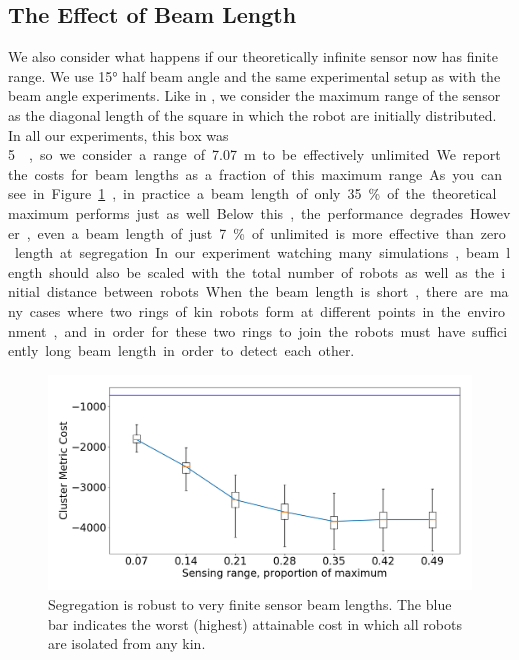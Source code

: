 \documentclass[conference]{IEEEtran}
\begin{document}
  \subsection{The Effect of Beam Length} \label{section:beam_length}

    We also consider what happens if our theoretically infinite sensor now has finite range. We use \ang{15} half beam angle and the same experimental setup as with the beam angle experiments. Like in \cite{gauci_self-organized_2014}, we consider the maximum range of the sensor as the diagonal length of the square in which the robot are initially distributed. In all our experiments, this box was \SI{5}{\meter\square}, so we consider a range of \SI{7.07}{\meter} to be effectively unlimited. We report the costs for beam lengths as a fraction of this maximum range. As you can see in Figure \ref{fig:beam_length}, in practice a beam length of only 35\% of the theoretical maximum performs just as well. Below this, the performance degrades. However, even a beam length of just 7\% of unlimited is more effective than zero length at segregation. In our experiment watching many simulations, beam length should also be scaled with the total number of robots as well as the initial distance between robots. When the beam length is short, there are many cases where two rings of kin robots form at different points in the environment, and in order for these two rings to join the robots must have sufficiently long beam length in order to detect each other.

    \begin{figure}
      \centering
      \includegraphics[width=1\linewidth]{./images/beam_length.png}
      \caption{Segregation is robust to very finite sensor beam lengths. The blue bar indicates the worst (highest) attainable cost in which all robots are isolated from any kin.}
      \label{fig:beam_length}
    \end{figure}
\end{document}
